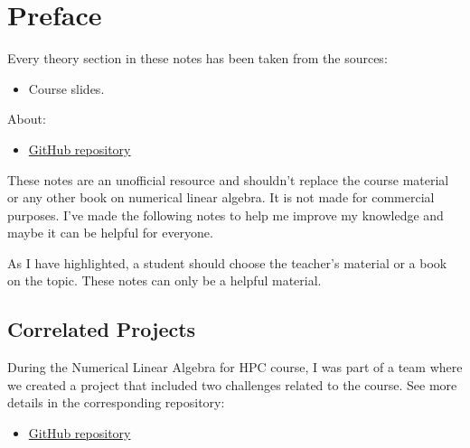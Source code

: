 \section*{Preface}

Every theory section in these notes has been taken from the sources:
\begin{itemize}
    \item Course slides.\cite{numerical-linear-algebra-polimi}
\end{itemize}
About:
\begin{itemize}
    \item[\faIcon{github}] \href{https://github.com/PoliMI-HPC-E-notes-projects-AndreVale69/HPC-E-PoliMI-university-notes}{GitHub repository}
    \begin{center}
    \end{center}
\end{itemize}
These notes are an unofficial resource and shouldn't replace the course material or any other book on numerical linear algebra. It is not made for commercial purposes. I've made the following notes to help me improve my knowledge and maybe it can be helpful for everyone.

As I have highlighted, a student should choose the teacher's material or a book on the topic. These notes can only be a helpful material.

\highspace

\subsection*{Correlated Projects}

During the Numerical Linear Algebra for HPC course, I was part of a team where we created a project that included two challenges related to the course. See more details in the corresponding repository:
\begin{itemize}
    \item[\faIcon{github}] \href{https://github.com/PoliMI-HPC-E-notes-projects-AndreVale69/NLA-challenges}{GitHub repository}
    \begin{center}
    \end{center}
\end{itemize}